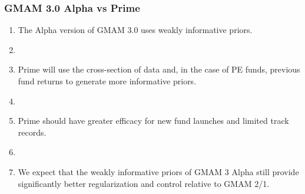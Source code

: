 \documentclass[10pt, compress]{beamer}
\begin{document}
\begin{frame}[fragile]
\frametitle{GMAM 3.0 Alpha vs Prime}
\begin{enumerate}
    \item The Alpha version of GMAM 3.0 uses weakly informative priors. 
    \item []
    \item Prime will use the cross-section of data and, in the case of PE funds, previous fund returns to generate more informative priors.
    \item []
    \item Prime should have greater efficacy for new fund launches and limited track records.
    \item []
    \item We expect that the weakly informative priors of GMAM 3 Alpha still provide significantly better regularization and control relative to GMAM 2/1.
\end{enumerate}
\end{frame}
\end{document}
